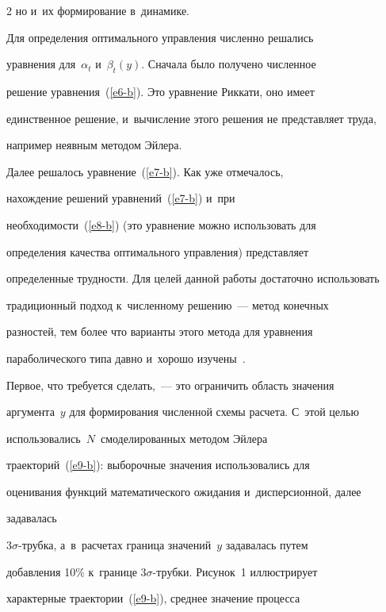\begin{multicols}{2}
но и~их формирование в~динамике.


     


     Для определения оптимального управления чис\-лен\-но решались 


уравнения для~$\alpha_t$ и~$\beta_t(y)$. Сначала было получено чис\-лен\-ное 


решение урав\-не\-ния~(\ref{e6-b}). Это уравнение Риккати, оно имеет 


единственное решение, и~вы\-чис\-ле\-ние этого решения не пред\-став\-ля\-ет труда, 


например неявным методом Эйлера.


     


     Далее решалось уравнение~(\ref{e7-b}). Как уже отмечалось, 


нахождение решений уравнений~(\ref{e7-b}) и~при  


необходимости~(\ref{e8-b}) (это уравнение можно использовать для 


определения качества оптимального управ\-ле\-ния) пред\-став\-ля\-ет 


определенные труд\-но\-сти. Для целей данной работы достаточно использовать 


традиционный подход к~чис\-лен\-но\-му решению~--- метод конечных 


разностей, тем более что варианты этого метода для урав\-не\-ния 


параболического типа дав\-но и~хорошо изучены~\cite{6-b}.


     


     Первое, что требуется сделать,~--- это ограничить область значения 


аргумента~$y$ для формирования численной схемы расчета. С~этой целью 


использовались~$N$~смоделированных методом Эйлера 


траекторий~(\ref{e9-b}): выборочные значения использовались для 


оценивания функций математического ожидания и~дисперсионной, далее 


задавалась  


$3\sigma$-труб\-ка, а~в~расчетах граница значений~$y$ задавалась путем 


добавления 10\% к~границе $3\sigma$-труб\-ки. Рисунок~1 иллюстрирует 


характерные траектории~(\ref{e9-b}), среднее значение процесса 



\end{multicols}

